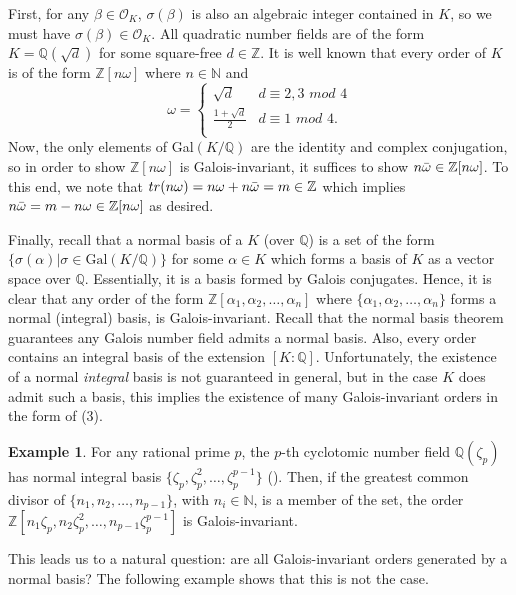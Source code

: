 \documentclass{amsart}
\theoremstyle{definition}
\newtheorem{ex}[lem]{Example}
\newcommand{\MO}{\mathcal{O}}
\newcommand{\bbz}{\mathbb{Z}}
\newcommand{\bbn}{\mathbb{N}}
\newcommand{\bbq}{\mathbb{Q}}
\numberwithin{equation}{section}
\begin{document}
First, for any $\beta \in \MO_K$, $\sigma(\beta)$ is also an algebraic integer contained in $K$, so we must have $\sigma(\beta) \in \MO_K$. All quadratic number fields are of the form $K = \bbq(\sqrt{d})$ for some square-free $d \in \bbz$. It is well known that every order of $K$ is of the form $\bbz[n\omega]$ where $n \in \bbn$ and 
\[
    \omega = \begin{cases} 
      \sqrt{d}  & d \equiv 2,3 \textit{ mod } 4 \\
      \frac{1+\sqrt{d}}{2} & d \equiv 1 \textit{ mod } 4. \\
   \end{cases}
\]
Now, the only elements of Gal$(K/\bbq)$ are the identity and complex conjugation, so in order to show $\bbz[n\omega]$ is Galois-invariant, it suffices to show $n \Bar{\omega} \in \bbz[n\omega]$. To this end, we note that $tr(n\omega) = n\omega + n \Bar{\omega} = m \in \bbz$ which implies $n \Bar{\omega} = m - n \omega \in \bbz[n \omega]$ as desired. 

Finally, recall that a normal basis of a $K$ (over $\bbq$) is a set of the form $\{\sigma(\alpha) | \sigma \in \text{Gal}(K/\bbq)\}$ for some $\alpha \in K$ which forms a basis of $K$ as a vector space over $\bbq$. Essentially, it is a basis formed by Galois conjugates. Hence, it is clear that any order of the form $\bbz[ \alpha_1, \alpha_2, \dots, \alpha_n]$ where $\{\alpha_1, \alpha_2, \dots, \alpha_n\}$ forms a normal (integral) basis, is Galois-invariant. Recall that the normal basis theorem guarantees any Galois number field admits a normal basis. Also, every order contains an integral basis of the extension $[K: \bbq]$. Unfortunately, the existence of a normal \textit{integral} basis is not guaranteed in general, but in the case $K$ does admit such a basis, this implies the existence of many Galois-invariant orders in the form of (3).

\begin{ex}
    For any rational prime $p$, the $p$-th cyclotomic number field $\bbq(\zeta_p)$ has normal integral basis $\{\zeta_p, \zeta_p^2, \dots, \zeta_p^{p-1}\}$ (\cite{narkiewicz1974elementary}). Then, if the greatest common divisor of $\{n_1, n_2, \dots, n_{p-1}\}$, with $n_i \in \bbn$, is a member of the set, the order $\bbz[ n_1 \zeta_p, n_2 \zeta_p^2, \dots, n_{p-1}\zeta_p^{p-1}] $ is Galois-invariant.
\end{ex}


This leads us to a natural question: are all Galois-invariant orders generated by a normal basis? The following example shows that this is not the case. 
\end{document}
